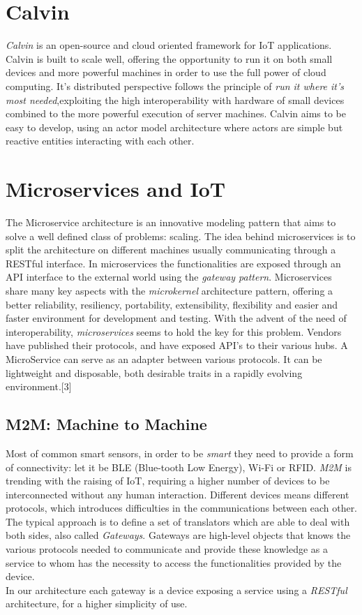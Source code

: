 \section{Calvin}

\textit{Calvin} is an open-source and cloud oriented framework
for IoT applications. Calvin is built to scale well, offering the opportunity
to run it on both small devices and more powerful machines in order to use the
full power of cloud computing. It's distributed perspective follows the principle
of \textit{run it where it's most needed},exploiting the high interoperability with
hardware of small devices combined to the more powerful execution of server machines.
Calvin aims to be easy to develop, using an actor model architecture where actors are
simple but reactive entities interacting with each other.

\section{Microservices and IoT}

The Microservice architecture is an innovative modeling pattern that aims
to solve a well defined class of problems: scaling.
The idea behind microservices is to split the architecture on different machines
usually communicating through a RESTful interface.
In microservices the
functionalities are exposed through an API interface to the external world using the
\textit{gateway pattern}. Microservices share many key aspects with the \textit{microkernel}
architecture pattern, offering a better reliability, resiliency, portability, extensibility,
flexibility and easier and faster environment for development and testing.
With the advent of the need of interoperability, \textit{microservices}
seems to hold the key for this problem.
Vendors have published their protocols, and have exposed API’s to their various hubs.
A MicroService can serve as an adapter between various protocols. It can be lightweight and disposable,
both desirable traits in a rapidly evolving environment.[3]

\subsection{M2M: Machine to Machine}

Most of common smart sensors, in order to be \textit{smart} they need
to provide a form of connectivity: let it be BLE (Blue-tooth Low Energy),
Wi-Fi or RFID. \textit{M2M} is trending with the raising of IoT,
requiring a higher number of devices to be interconnected without
any human interaction. Different devices means different protocols,
which introduces difficulties in the communications between each other.
The typical approach is to define a set of translators which
are able to deal with both sides, also called \textit{Gateways}.
Gateways are high-level objects that knows the various protocols
needed to communicate and provide these knowledge as a service to
whom has the necessity to access the functionalities provided by the
device. \\
In our architecture each gateway is a device exposing a service using
a \textit{RESTful} architecture, for a higher simplicity of use.

